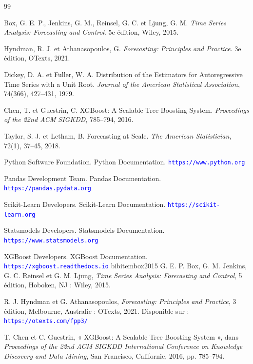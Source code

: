 \documentclass[a4paper,12pt]{report}
\theoremstyle{definition}
\begin{document}
	\begin{thebibliography}{99}
		
		Box, G. E. P., Jenkins, G. M., Reinsel, G. C. et Ljung, G. M.
		\textit{Time Series Analysis: Forecasting and Control}.
		5e édition, Wiley, 2015.
		
		Hyndman, R. J. et Athanasopoulos, G.
		\textit{Forecasting: Principles and Practice}.
		3e édition, OTexts, 2021.
		
		Dickey, D. A. et Fuller, W. A.
		Distribution of the Estimators for Autoregressive Time Series with a Unit Root.
		\textit{Journal of the American Statistical Association},
		74(366), 427--431, 1979.
		
		Chen, T. et Guestrin, C.
		XGBoost: A Scalable Tree Boosting System.
		\textit{Proceedings of the 22nd ACM SIGKDD},
		785--794, 2016.
		
		Taylor, S. J. et Letham, B.
		Forecasting at Scale.
		\textit{The American Statistician},
		72(1), 37--45, 2018.
		
		Python Software Foundation.
		Python Documentation.
		\texttt{\textcolor{blue}{https://www.python.org}}
		
		Pandas Development Team.
		Pandas Documentation.
		\texttt{\textcolor{blue}{https://pandas.pydata.org}}
		
		Scikit-Learn Developers.
		Scikit-Learn Documentation.
		\texttt{\textcolor{blue}{https://scikit-learn.org}}
		
		Statsmodels Developers.
		Statsmodels Documentation.
		\texttt{\textcolor{blue}{https://www.statsmodels.org}}
		
		XGBoost Developers.
		XGBoost Documentation.
		\texttt{\textcolor{blue}{https://xgboost.readthedocs.io}}
		bibitem{box2015}
		G. E. P. Box, G. M. Jenkins, G. C. Reinsel et G. M. Ljung,
		\textit{Time Series Analysis: Forecasting and Control},
		5\ieme{} édition, Hoboken, NJ : Wiley, 2015.
		
		R. J. Hyndman et G. Athanasopoulos,
		\textit{Forecasting: Principles and Practice},
		3\ieme{} édition, Melbourne, Australie : OTexts, 2021.
		Disponible sur :
		\texttt{\textcolor{blue}{https://otexts.com/fpp3/}}
		
		T. Chen et C. Guestrin,
		« XGBoost: A Scalable Tree Boosting System »,
		dans \textit{Proceedings of the 22nd ACM SIGKDD International Conference on Knowledge Discovery and Data Mining},
		San Francisco, Californie, 2016, pp. 785--794.
	\end{thebibliography}
	\clearpage
\end{document}
